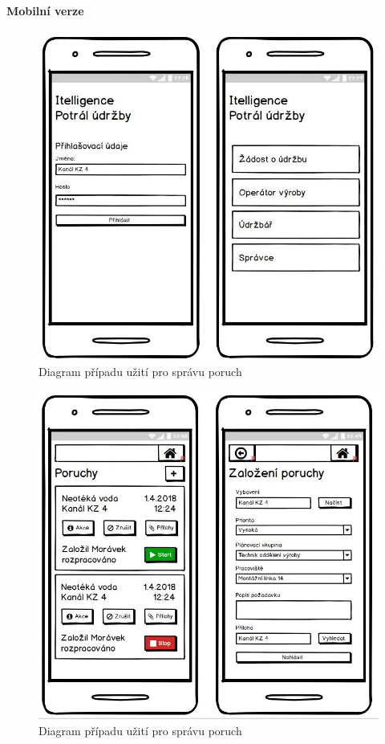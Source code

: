 \documentclass[thesis=M,czech]{FITthesis}[2012/06/26]
\begin{document}
\paragraph{Mobilní verze}

\begin{figure}[H]
	\centering
	\includegraphics[width=1\textwidth]{images/bal_login_hompage_mob}
	\caption{Diagram případu užití pro správu poruch}
	\label{img:uc_sprava_poruch}
\end{figure}

\begin{figure}[H]
	\centering
	\includegraphics[width=1\textwidth]{images/bal_poruchy_mob}
	\caption{Diagram případu užití pro správu poruch}
	\label{img:uc_sprava_poruch}
\end{figure}
\end{document}

